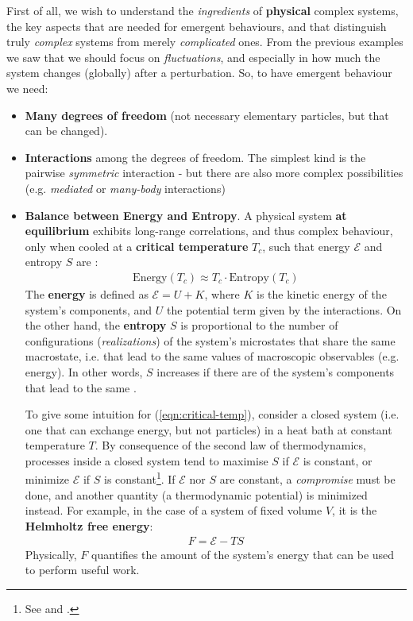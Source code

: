 \documentclass[../../main.tex]{subfiles}
\begin{document}
First of all, we wish to understand the \textit{ingredients} of \textbf{physical }complex systems, the key aspects that are needed for emergent behaviours, and that distinguish truly \textit{complex} systems from merely \textit{complicated} ones. From the previous examples we saw that we should focus on \textit{fluctuations}, and especially in how much the system changes (globally) after a perturbation. So, to have emergent behaviour we need:
\begin{itemize}
    \item \textbf{Many degrees of freedom} (not necessary elementary particles, but  that can be changed).
    \item \textbf{Interactions} among the degrees of freedom. The simplest kind is the pairwise \textit{symmetric} interaction - but there are also more complex possibilities (e.g. \textit{mediated} or \textit{many-body} interactions)
    \item \textbf{Balance between Energy and Entropy}. A physical system \textbf{at equilibrium} exhibits long-range correlations, and thus complex behaviour, only when cooled at a \textbf{critical temperature} $T_c$, such that energy $\mathcal{E}$ and entropy $S$ are :
    \begin{align} \label{eqn:critical-temp}
        \text{Energy}(T_c) \approx T_c \cdot \text{Entropy}(T_c)    
    \end{align}
    The \textbf{energy} is defined as $\mathcal{E} = U + K$, where $K$ is the kinetic energy of the system's components, and $U$ the potential term given by the interactions. On the other hand, the \textbf{entropy} $S$ is proportional to the number of configurations (\textit{realizations}) of the system's microstates that share the same macrostate, i.e. that lead to the same values of macroscopic observables (e.g. energy). In other words, $S$ increases if there are  of the system's components that lead to the same . 

    \medskip

    To give some intuition for (\ref{eqn:critical-temp}), consider a closed system (i.e. one that can exchange energy, but not particles) in a heat bath at constant temperature $T$. By consequence of the second law of thermodynamics, processes inside a closed system tend to maximise $S$ if $\mathcal{E}$ is constant, or minimize $\mathcal{E}$ if $S$ is constant\footnote{See  and .}. If $\mathcal{E}$ nor $S$ are constant, a \textit{compromise} must be done, and another quantity (a thermodynamic potential) is minimized instead. For example, in the case of a system of fixed volume $V$, it is the \textbf{Helmholtz free energy}:
    \begin{align} \label{eqn:free-energy}
        F = \mathcal{E} - TS
    \end{align}
    Physically, $F$ quantifies the amount of the system's energy that can be used to perform useful work. 


\end{itemize}
\end{document}
